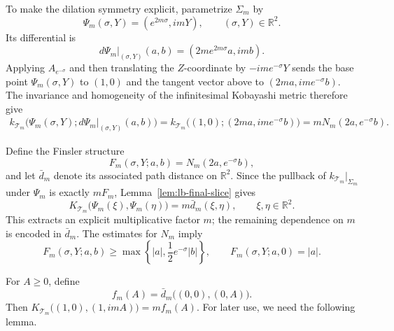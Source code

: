 \documentclass[11pt]{article}
\theoremstyle{definition}
\begin{document}
To make the dilation symmetry explicit, parametrize $\Sigma_m$ by
\[
 \Psi_m(\sigma,Y)=(e^{2m\sigma},imY),
 \qquad (\sigma,Y)\in\mathbb R^2.
\]
Its differential is
\[
 d\Psi_m|_{(\sigma,Y)}(a,b)
 =(2me^{2m\sigma}a,imb).
\]
Applying $A_{e^{-\sigma}}$ and then translating the $Z$-coordinate by
$-im e^{-\sigma}Y$ sends the base point $\Psi_m(\sigma,Y)$ to $(1,0)$ and
the tangent vector above to $(2ma,ime^{-\sigma}b)$. The invariance and
homogeneity of the infinitesimal Kobayashi metric therefore give
\[
 \begin{aligned}
 k_{\mathcal T_m}\bigl(
 \Psi_m(\sigma,Y);d\Psi_m|_{(\sigma,Y)}(a,b)\bigr)
 =k_{\mathcal T_m}\bigl((1,0);(2ma,ime^{-\sigma}b)\bigr)
 =mN_m(2a,e^{-\sigma}b).
 \end{aligned}
\]

Define the Finsler structure
\[
 F_m(\sigma,Y;a,b)=N_m(2a,e^{-\sigma}b),
\]
and let $\bar d_m$ denote its associated path distance on $\mathbb R^2$.
Since the pullback of $k_{\mathcal T_m}|_{\Sigma_m}$ under $\Psi_m$ is
exactly $mF_m$, Lemma~\ref{lem:lb-final-slice} gives
\begin{equation}\label{eq:lb-final-factorization}
 K_{\mathcal T_m}\bigl(\Psi_m(\xi),\Psi_m(\eta)\bigr)
 =m\bar d_m(\xi,\eta),
 \qquad \xi,\eta\in\mathbb R^2.
\end{equation}
This extracts an explicit multiplicative factor $m$; the remaining dependence
on $m$ is encoded in $\bar d_m$. The estimates for $N_m$ imply
\begin{equation}\label{eq:lb-final-F-bounds}
 F_m(\sigma,Y;a,b)
 \geq\max\left\{|a|,\frac12e^{-\sigma}|b|\right\},
 \qquad
 F_m(\sigma,Y;a,0)=|a|.
\end{equation}

For $A\geq0$, define
\[
 f_m(A)=\bar d_m\bigl((0,0),(0,A)\bigr).
\]
Then
\(
 K_{\mathcal T_m}\bigl((1,0),(1,imA)\bigr)=mf_m(A).
\)
For later use, we need the following lemma.
\end{document}
